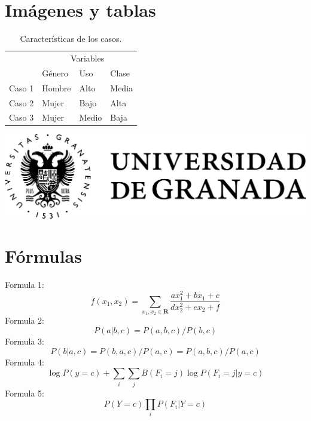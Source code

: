 \documentclass[12pt]{article}
\begin{document}
\section{Im\'agenes y tablas}
\begin{table}[htb]
\centering
\begin{tabular}{|l|l|l|l|}
\hline
& \multicolumn{3}{c|}{Variables} \\
\cline{2-4}
& Género & Uso & Clase\\
\hline \hline
Caso 1 & Hombre & Alto & Media\\ \cline{1-4}
Caso 2 & Mujer & Bajo & Alta \\ \cline{1-4}
Caso 3 & Mujer & Medio & Baja\\ \cline{1-4}
\end{tabular}
\caption{Características de los casos.}
\label{tabla:final}
\end{table}

\includegraphics[scale=0.5]{logo}

\section{F\'ormulas}
\noindent
Formula 1:
\[
f(x_{1}, x_{2}) = \sum_{x_{1}, x_{2}\in \mathbf{R}} \frac{ax_{1}^2 + bx_{1} + c}{dx_{2}^2 + ex_{2} + f}
\]
Formula 2:
\[P(a|b,c)=P(a,b,c)/P(b,c)\]
Formula 3:
\[P(b|a,c)=P(b,a,c)/P(a,c)=P(a,b,c)/P(a,c)\]
Formula 4:
\[\log P(y=c) + \sum_{i} \sum_{j} B(F_i = j) \log P(F_i = j|y=c)\]
Formula 5:
\[P(Y=c)\prod_{i} P(F_i|Y=c)\]



\end{document}
